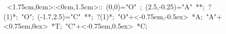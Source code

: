 
\hbox{
\xy    <1.75cm,0cm>:<0cm,1.5cm>::
       (0,0)="O" ; (2.5,-0.25)="A" **\dir{-};  ?(1)*\dir{>};
       "O"; (-1.7,2.5)="C" **\dir{-};  ?(1)*\dir{>};
       "O"+<-0.75em,-0.5ex> *{A};
       "A"+<0.75em,0ex> *{T};
       "C"+<-0.75em,0.5ex> *{C};
       \endxy}
	   
